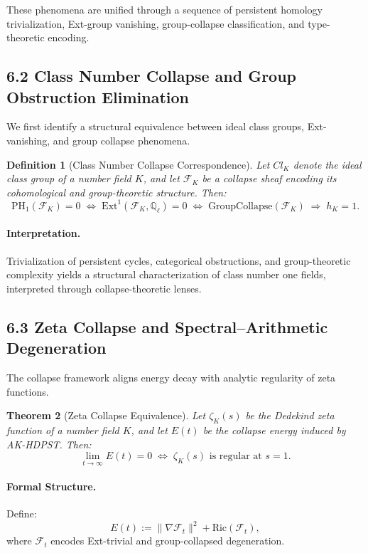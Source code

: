 \documentclass[11pt]{article}
\newtheorem{theorem}{Theorem}[section]
\newtheorem{definition}[theorem]{Definition}
\begin{document}
These phenomena are unified through a sequence of persistent homology trivialization, Ext-group vanishing, group-collapse classification, and type-theoretic encoding.

\subsection*{6.2 Class Number Collapse and Group Obstruction Elimination}

We first identify a structural equivalence between ideal class groups, Ext-vanishing, and group collapse phenomena.

\begin{definition}[Class Number Collapse Correspondence]
Let \( Cl_K \) denote the ideal class group of a number field \( K \),  
and let \( \mathcal{F}_K \) be a collapse sheaf encoding its cohomological and group-theoretic structure. Then:
\[
\mathrm{PH}_1(\mathcal{F}_K) = 0 \;\Leftrightarrow\; \mathrm{Ext}^1(\mathcal{F}_K, \mathbb{Q}_\ell) = 0 \;\Leftrightarrow\; \text{GroupCollapse}(\mathcal{F}_K) \;\Rightarrow\; h_K = 1.
\]
\end{definition}

\paragraph{Interpretation.}
Trivialization of persistent cycles, categorical obstructions, and group-theoretic complexity yields a structural characterization of class number one fields, interpreted through collapse-theoretic lenses.

\subsection*{6.3 Zeta Collapse and Spectral–Arithmetic Degeneration}

The collapse framework aligns energy decay with analytic regularity of zeta functions.

\begin{theorem}[Zeta Collapse Equivalence]
Let \( \zeta_K(s) \) be the Dedekind zeta function of a number field \( K \), and let \( E(t) \) be the collapse energy induced by AK-HDPST. Then:
\[
\lim_{t \to \infty} E(t) = 0 \;\Leftrightarrow\; \zeta_K(s) \text{ is regular at } s = 1.
\]
\end{theorem}

\paragraph{Formal Structure.}
Define:
\[
E(t) := \| \nabla \mathcal{F}_t \|^2 + \text{Ric}(\mathcal{F}_t),
\]
where \( \mathcal{F}_t \) encodes Ext-trivial and group-collapsed degeneration.
\end{document}
